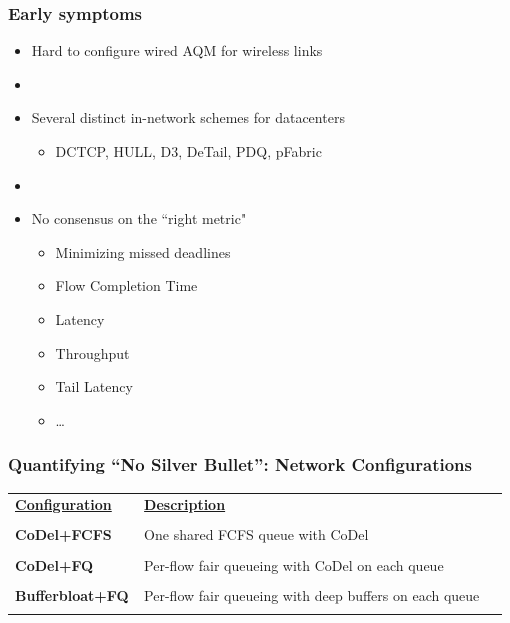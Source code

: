\begin{frame}[plain]
\frametitle{Early symptoms}
\begin{itemize}
\item{Hard to configure wired AQM for wireless links}

\item[]

\item{Several distinct in-network schemes for datacenters}
\begin{itemize}
\item DCTCP, HULL, D3, DeTail, PDQ, pFabric
\end{itemize}

\item[]

\item{No consensus on the ``right metric"}
\begin{itemize}
\item Minimizing missed deadlines
\item Flow Completion Time
\item Latency
\item Throughput
\item Tail Latency
\item \dots 
\end{itemize}

\end{itemize}
\end{frame}

\begin{frame}[plain]
\frametitle{Quantifying ``No Silver Bullet'': Network Configurations}
\begin{table}
\begin{tabular}{|p{0.25\linewidth}|p{0.73\linewidth}|}
\hline
{\bf \underline{Configuration}} & {\bf \underline{Description}} \\
&\\
{\bf CoDel+FCFS} & One shared FCFS queue with CoDel\\
& \\
{\bf CoDel+FQ} & Per-flow fair queueing with CoDel on each queue\\ 
&\\
{\bf Bufferbloat+FQ} & Per-flow fair queueing with deep buffers on
each queue\\ 
& \\
\hline
\end{tabular}
\end{table}
\end{frame}

